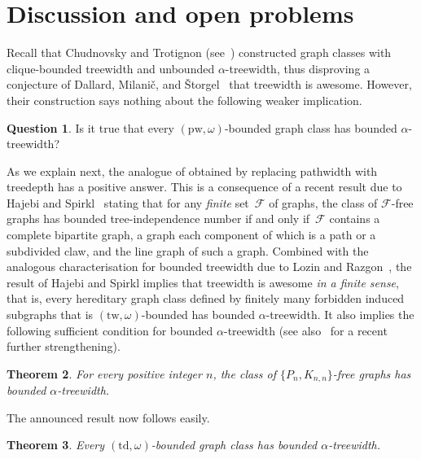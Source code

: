 \documentclass[11pt]{article}
\newcommand{\td}{\mathrm{td}}
\newcommand{\tw}{\mathrm{tw}}
\newcommand{\pw}{\mathrm{pw}}
\theoremstyle{plain}
\newtheorem{theorem}{Theorem}[section]
\theoremstyle{definition}
\newtheorem{question}[theorem]{Question}
\theoremstyle{remark}
\numberwithin{equation}{section}
\begin{document}
\section{Discussion and open problems}\label{sec:conclusion}

Recall that Chudnovsky and Trotignon (see~\cite{CT24}) constructed graph classes with clique-bounded treewidth and unbounded $\alpha$-treewidth, thus disproving a conjecture of Dallard, Milani\v{c}, and \v{S}torgel~\cite{dallard2022secondpaper} that treewidth is awesome.
However, their construction says nothing about the following weaker implication.

\begin{question}\label{question-pw}
Is it true that every $(\pw,\omega)$-bounded graph class has bounded \hbox{$\alpha$-treewidth}?
\end{question}

As we explain next, the analogue of  obtained by replacing pathwidth with treedepth has a positive answer.
This is a consequence of a recent result due to Hajebi and Spirkl~\cite{hajebi2026treealphaexcludingfinitelygraphs} stating that for any \textsl{finite} set~$\mathcal{F}$ of graphs, the class of $\mathcal{F}$-free graphs has bounded tree-independence number if and only if~$\mathcal{F}$ contains a complete bipartite graph, a graph each component of which is a path or a subdivided claw, and the line graph of such a graph.
Combined with the analogous characterisation for bounded treewidth due to Lozin and Razgon~\cite{MR4385180}, the result of Hajebi and Spirkl implies that treewidth is awesome \textsl{in a finite sense}, that is, every hereditary graph class defined by finitely many forbidden induced subgraphs that is $(\tw,\omega)$-bounded has bounded $\alpha$-treewidth.
It also implies the following sufficient condition for bounded $\alpha$-treewidth (see also~\cite[Theorem 1.2]{nikabadi2026inducedpackingtreewidthii} for a recent further strengthening).

\begin{theorem}\label{thm:Pn_Knn}
For every positive integer $n$, the class of $\{P_n,K_{n,n}\}$-free graphs has bounded $\alpha$-treewidth.
\end{theorem}

The announced result now follows easily.

\begin{theorem}\label{thm:td}
Every $(\td,\omega)$-bounded graph class has bounded $\alpha$-treewidth.
\end{theorem}
\end{document}
